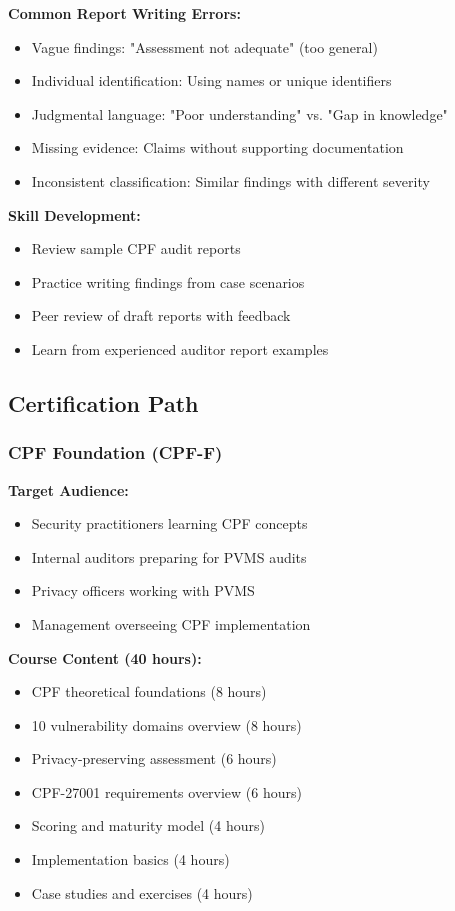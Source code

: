\documentclass[11pt,a4paper]{article}
\begin{document}
\textbf{Common Report Writing Errors:}

\begin{itemize}
\item Vague findings: "Assessment not adequate" (too general)
\item Individual identification: Using names or unique identifiers
\item Judgmental language: "Poor understanding" vs. "Gap in knowledge"
\item Missing evidence: Claims without supporting documentation
\item Inconsistent classification: Similar findings with different severity
\end{itemize}

\textbf{Skill Development:}

\begin{itemize}
\item Review sample CPF audit reports
\item Practice writing findings from case scenarios
\item Peer review of draft reports with feedback
\item Learn from experienced auditor report examples
\end{itemize}

\subsection{Certification Path}

\subsubsection{CPF Foundation (CPF-F)}

\textbf{Target Audience:}
\begin{itemize}
\item Security practitioners learning CPF concepts
\item Internal auditors preparing for PVMS audits
\item Privacy officers working with PVMS
\item Management overseeing CPF implementation
\end{itemize}

\textbf{Course Content (40 hours):}

\begin{itemize}
\item CPF theoretical foundations (8 hours)
\item 10 vulnerability domains overview (8 hours)
\item Privacy-preserving assessment (6 hours)
\item CPF-27001 requirements overview (6 hours)
\item Scoring and maturity model (4 hours)
\item Implementation basics (4 hours)
\item Case studies and exercises (4 hours)
\end{itemize}
\end{document}
